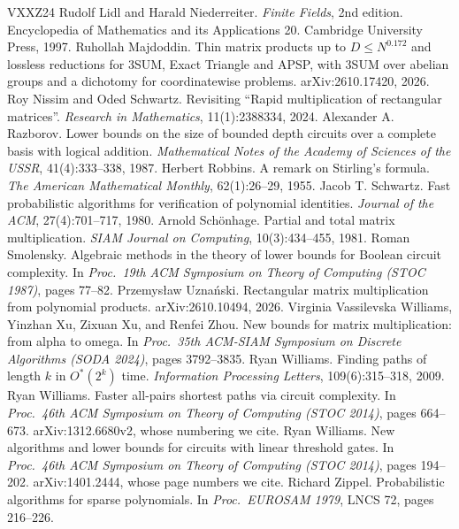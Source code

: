 \documentclass[11pt]{article}
\theoremstyle{definition}
\theoremstyle{remark}
\begin{document}
\begin{thebibliography}{VXXZ24}
 Rudolf Lidl and Harald Niederreiter. \emph{Finite Fields}, 2nd edition. Encyclopedia of Mathematics and its Applications 20. Cambridge University Press, 1997.
 Ruhollah Majdoddin. Thin matrix products up to $D\le N^{0.172}$ and lossless reductions for 3SUM, Exact Triangle and APSP, with 3SUM over abelian groups and a dichotomy for coordinatewise problems. arXiv:2610.17420, 2026.
 Roy Nissim and Oded Schwartz. Revisiting ``Rapid multiplication of rectangular matrices''. \emph{Research in Mathematics}, 11(1):2388334, 2024.
 Alexander A. Razborov. Lower bounds on the size of bounded depth circuits over a complete basis with logical addition. \emph{Mathematical Notes of the Academy of Sciences of the USSR}, 41(4):333--338, 1987.
 Herbert Robbins. A remark on Stirling's formula. \emph{The American Mathematical Monthly}, 62(1):26--29, 1955.
 Jacob T. Schwartz. Fast probabilistic algorithms for verification of polynomial identities. \emph{Journal of the ACM}, 27(4):701--717, 1980.
 Arnold Schönhage. Partial and total matrix multiplication. \emph{SIAM Journal on Computing}, 10(3):434--455, 1981.
 Roman Smolensky. Algebraic methods in the theory of lower bounds for Boolean circuit complexity. In \emph{Proc.\ 19th ACM Symposium on Theory of Computing (STOC 1987)}, pages 77--82.
 Przemysław Uznański. Rectangular matrix multiplication from polynomial products. arXiv:2610.10494, 2026.
 Virginia Vassilevska Williams, Yinzhan Xu, Zixuan Xu, and Renfei Zhou. New bounds for matrix multiplication: from alpha to omega. In \emph{Proc.\ 35th ACM-SIAM Symposium on Discrete Algorithms (SODA 2024)}, pages 3792--3835.
 Ryan Williams. Finding paths of length $k$ in $O^*(2^k)$ time. \emph{Information Processing Letters}, 109(6):315--318, 2009.
 Ryan Williams. Faster all-pairs shortest paths via circuit complexity. In \emph{Proc.\ 46th ACM Symposium on Theory of Computing (STOC 2014)}, pages 664--673. arXiv:1312.6680v2, whose numbering we cite.
 Ryan Williams. New algorithms and lower bounds for circuits with linear threshold gates. In \emph{Proc.\ 46th ACM Symposium on Theory of Computing (STOC 2014)}, pages 194--202. arXiv:1401.2444, whose page numbers we cite.
 Richard Zippel. Probabilistic algorithms for sparse polynomials. In \emph{Proc.\ EUROSAM 1979}, LNCS 72, pages 216--226.
\end{thebibliography}
\end{document}
